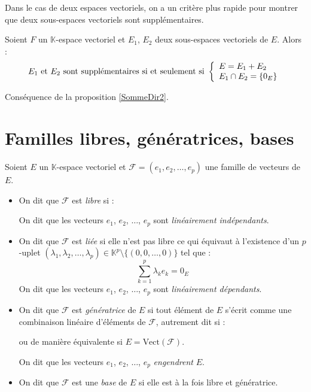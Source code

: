 \documentclass[a4paper,10pt]{report}
\begin{document}
\noindent Dans le cas de deux espaces vectoriels, on a un critère plus rapide pour montrer que deux sous-espaces vectoriels sont supplémentaires.

 \begin{prop}
 Soient $F$ un $\mathbb{K}$-espace vectoriel et $E_1$, $E_2$ deux sous-espaces vectoriels de $E$. Alors :
 $$ E_1 \hbox{ et } E_2 \hbox{ sont supplémentaires si et seulement si } \left\lbrace\begin{array}{l}
 E=E_1+ E_2 \\
 E_1 \cap E_2 = \lbrace 0_E \rbrace
 \end{array}\right.$$
 \end{prop}
 
 \begin{preuve}
 Conséquence de la proposition \ref{SommeDir2}.
 \end{preuve}
 \section{Familles libres, génératrices, bases}
 
 \begin{defin}
Soient $E$ un $\mathbb{K}$-espace vectoriel et $\mathcal{F} = (e_1, e_2, \ldots, e_p)$ une famille de vecteurs de $E$.

\begin{itemize}
\item On dit que $\mathcal{F}$ est \textit{libre} si  :

\vspace{1cm}
%
On dit que les vecteurs $e_1$, $e_2$, $\ldots$, $e_p$ sont \textit{linéairement indépendants}.
\item On dit que $\mathcal{F}$ est \textit{liée} si elle n'est pas libre ce qui équivaut à l'existence d'un $p$-uplet \newline $(\lambda_1, \lambda_2, \ldots, \lambda_p) \in \mathbb{K}^p \setminus \lbrace (0,0, \ldots,0) \rbrace$ tel que :
$$ \sum_{k=1}^p \lambda_k e_k = 0_E$$
On dit que les vecteurs $e_1$, $e_2$, $\ldots$, $e_p$ sont \textit{linéairement dépendants}.
\item On dit que $\mathcal{F}$ est \textit{génératrice} de $E$ si tout élément de $E$ s'écrit comme une combinaison linéaire d'éléments de $\mathcal{F}$, autrement dit si :

\vspace{1cm}

ou de manière équivalente si $E = \textrm{Vect}(\mathcal{F})$.

\noindent On dit que les vecteurs $e_1$, $e_2$, $\ldots$, $e_p$ \textit{engendrent} $E$.
\item On dit que $\mathcal{F}$ est une \textit{base} de $E$ si elle est à la fois libre et génératrice.
\end{itemize}
\end{defin}
\end{document}
